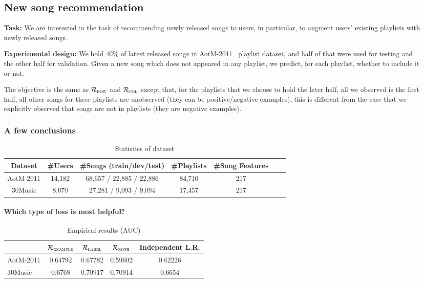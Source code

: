 \subsection{New song recommendation}

{\bf Task:} 
We are interested in the task of recommending newly released songs to users,
in particular, to augment users' existing playlists with newly released songs.

{\bf Experimental design:} 
We hold 40\% of latest released songs in AotM-2011~\cite{mcfee2012hypergraph} playlist dataset,
and half of that were used for testing and the other half for validation.
Given a new song which does not appeared in any playlist, 
we predict, for each playlist, whether to include it or not.

The objective is the same as $\mathcal{R}_\textsc{row}$ and $\mathcal{R}_\textsc{col}$ except that,
for the playlists that we choose to hold the later half, all we observed is the first half, 
all other songs for these playlists are unobserved (they can be positive/negative examples),
this is different from the case that we explicitly observed that songs are not in playlists (they are negative examples).


\subsubsection{A few conclusions}
\begin{table}[!h]
\centering
\caption{Statistics of dataset}
\begin{tabular}{ccccccc}
\toprule
Dataset & \#Users & \#Songs (train/dev/test) & \#Playlists & \#Song Features \\
\midrule
AotM-2011 & 14,182  & 68,657 / 22,885 / 22,886 & 84,710 & 217 \\
30Music   & 8,070   & 27,281 / 9,093 / 9,094   & 17,457 & 217 \\
\bottomrule
\end{tabular}
\end{table}

\paragraph{Which type of loss is most helpful?}
\begin{table}[!h]
\centering
\caption{Empirical results (AUC)}
\begin{tabular}{l|cccc}
\toprule
{}            & $\mathcal{R}_\textsc{example}$ & $\mathcal{R}_\textsc{label}$ & $\mathcal{R}_\textsc{both}$ & Independent L.R. \\
\midrule
AotM-2011     & 0.64792  & 0.67782 & 0.59602  & 0.62226 \\
30Music       & 0.6768   & 0.70917 & 0.70914  & 0.6654 \\
\bottomrule
\end{tabular}
\end{table}

